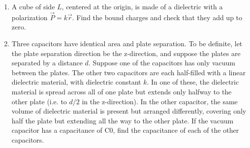 \documentclass[fleqn]{article}
\begin{document}
\begin{enumerate}

    \item A cube of side $L$, centered at the origin, is made of a dielectric with a polarization $\overrightarrow{P}=k \overrightarrow{r}$.
    Find the bound charges and check that they add up to zero.

  
    \item Three capacitors have identical area and plate separation. To be definite, let the plate separation direction be 
    the z-direction, and suppose the plates are separated by a distance $d$. Suppose one of the capacitors has only vacuum between the plates. The other two capacitors are
    each half-filled with a linear dielectric material, with dielectric constant $k$. In one of these, the dielectric material is 
    spread across all of one plate but extends only halfway to the other plate (i.e. to $d/2$ in the z-direction). In the other 
    capacitor, the same volume of dielectric material is present but arranged differently, covering only half the plate
    but extending all the way to the other plate. If the vacuum capacitor has a capacitance of C0, find the capacitance of each 
    of the other capacitors.


  \end{enumerate}
\end{document}
